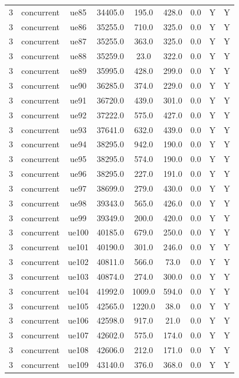 \begin{table}[ht]
\begin{tabular}{|c|c|c|c|c|c|c|c|c|}
3 & concurrent & ue85 & 34405.0 & 195.0 & 428.0 & 0.0 & Y & Y \\
3 & concurrent & ue86 & 35255.0 & 710.0 & 325.0 & 0.0 & Y & Y \\
3 & concurrent & ue87 & 35255.0 & 363.0 & 325.0 & 0.0 & Y & Y \\
3 & concurrent & ue88 & 35259.0 & 23.0 & 322.0 & 0.0 & Y & Y \\
3 & concurrent & ue89 & 35995.0 & 428.0 & 299.0 & 0.0 & Y & Y \\
3 & concurrent & ue90 & 36285.0 & 374.0 & 229.0 & 0.0 & Y & Y \\
3 & concurrent & ue91 & 36720.0 & 439.0 & 301.0 & 0.0 & Y & Y \\
3 & concurrent & ue92 & 37222.0 & 575.0 & 427.0 & 0.0 & Y & Y \\
3 & concurrent & ue93 & 37641.0 & 632.0 & 439.0 & 0.0 & Y & Y \\
3 & concurrent & ue94 & 38295.0 & 942.0 & 190.0 & 0.0 & Y & Y \\
3 & concurrent & ue95 & 38295.0 & 574.0 & 190.0 & 0.0 & Y & Y \\
3 & concurrent & ue96 & 38295.0 & 227.0 & 191.0 & 0.0 & Y & Y \\
3 & concurrent & ue97 & 38699.0 & 279.0 & 430.0 & 0.0 & Y & Y \\
3 & concurrent & ue98 & 39343.0 & 565.0 & 426.0 & 0.0 & Y & Y \\
3 & concurrent & ue99 & 39349.0 & 200.0 & 420.0 & 0.0 & Y & Y \\
3 & concurrent & ue100 & 40185.0 & 679.0 & 250.0 & 0.0 & Y & Y \\
3 & concurrent & ue101 & 40190.0 & 301.0 & 246.0 & 0.0 & Y & Y \\
3 & concurrent & ue102 & 40811.0 & 566.0 & 73.0 & 0.0 & Y & Y \\
3 & concurrent & ue103 & 40874.0 & 274.0 & 300.0 & 0.0 & Y & Y \\
3 & concurrent & ue104 & 41992.0 & 1009.0 & 594.0 & 0.0 & Y & Y \\
3 & concurrent & ue105 & 42565.0 & 1220.0 & 38.0 & 0.0 & Y & Y \\
3 & concurrent & ue106 & 42598.0 & 917.0 & 21.0 & 0.0 & Y & Y \\
3 & concurrent & ue107 & 42602.0 & 575.0 & 174.0 & 0.0 & Y & Y \\
3 & concurrent & ue108 & 42606.0 & 212.0 & 171.0 & 0.0 & Y & Y \\
3 & concurrent & ue109 & 43140.0 & 376.0 & 368.0 & 0.0 & Y & Y \\

\end{tabular}
\end{table}
